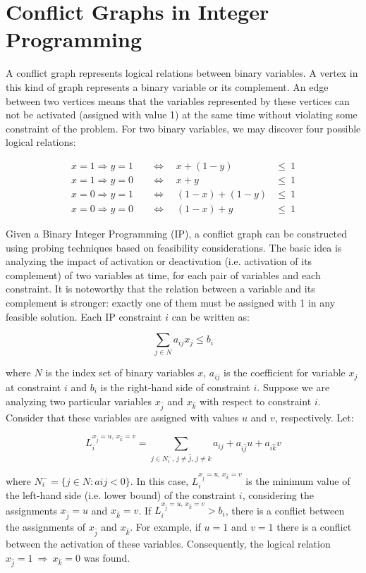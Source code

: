 \documentclass{endm}
\begin{document}
\section{Conflict Graphs in Integer Programming}\label{graph}

A conflict graph represents logical relations between binary variables. A vertex in this kind of graph represents a binary variable or its complement. An edge between two vertices means that the variables represented by these vertices can not be activated (assigned with value 1) at the same time without violating some constraint of the problem. For two binary variables, we may discover four possible logical relations:

\begin{align}
x = 1 \Rightarrow y = 1 & \quad \Longleftrightarrow \quad x + (1 - y) & \leq \ 1\\
x = 1 \Rightarrow y = 0 & \quad \Longleftrightarrow \quad x + y & \leq \ 1 \\
x = 0 \Rightarrow y = 1 & \quad \Longleftrightarrow \quad (1 - x) + (1 - y) & \leq \ 1 \\
x = 0 \Rightarrow y = 0 & \quad \Longleftrightarrow \quad (1 - x) + y & \leq \ 1
\end{align}

Given a Binary Integer Programming (IP), a conflict graph can be constructed using probing techniques based on feasibility considerations. The basic idea is analyzing the impact of activation or deactivation (i.e. activation of its complement) of two variables at time, for each pair of variables and each constraint. It is noteworthy that the relation between a variable and its complement is stronger: exactly one of them must be assigned with 1 in any feasible solution. Each IP constraint $i$ can be written as:

\[\sum_{j \in N} a_{ij}x_{j} \leq b_{i}\]

\noindent where $N$ is the index set of binary variables $x$, $a_{ij}$ is the coefficient for variable $x_{j}$ at constraint $i$ and $b_{i}$ is the right-hand side of constraint $i$. Suppose we are analyzing two particular variables $x_{\hat{j}}$ and $x_{\hat{k}}$ with respect to constraint $i$. Consider that these variables are assigned with values $u$ and $v$, respectively. Let:

\[ L_{i}^{x_{\hat{j}} = u,\, x_{\hat{k}} = v}=\sum_{j\in N_{i}^{-},\, j\neq\hat{j},\, j\neq\hat{k}}a_{ij}+a_{i\hat{j}}u+a_{i\hat{k}}v \]

\noindent where $N_{i}^{-} = \{j \in N : aij < 0\}$. In this case, $L_{i}^{x_{\hat{j}} = u,\, x_{\hat{k}} = v}$ is the minimum value of the left-hand side (i.e. lower bound) of the constraint $i$, considering the assignments $x_{\hat{j}} = u$ and $x_{\hat{k}} = v$. If $L_{i}^{x_{\hat{j}} = u,\, x_{\hat{k}} = v} > b_{i}$, there is a conflict between the assignments of $x_{\hat{j}}$ and $x_{\hat{k}}$. For example, if $u = 1$ and $v = 1$ there is a conflict between the activation of these variables. Consequently, the logical relation $x_{\hat{j}} = 1 \ \Rightarrow \ x_{\hat{k}} = 0$ was found.
\end{document}
